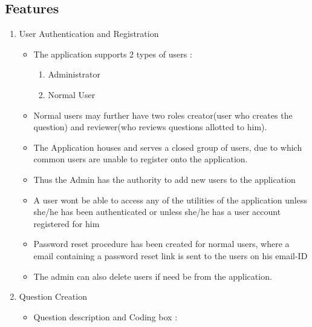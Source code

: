 \documentclass[a4paper,12pt,oneside]{book}
\begin{document}
\subsection{Features}
    \begin{enumerate}
      \item User Authentication and Registration
        \begin{itemize}
            \item The application supports 2 types of users :
                \begin{enumerate}
                    \item Administrator 
                    \item Normal User
                \end{enumerate}
                
            \item Normal users may further have two roles creator(user who creates the question) and reviewer(who reviews questions allotted to him).
            
            \item The Application houses and serves a closed group of users, due to which common users are unable to register onto the application. 
            
            \item Thus the Admin has the authority to add new users to the application 
            
            \item A user wont be able to access any of the utilities of the application unless she/he has been authenticated or unless she/he has a user account registered for him 
            
            \item Password reset procedure has been created for normal users, where a email containing a password reset link is sent to the users on his email-ID 
            
            \item The admin can also delete users if need be from the application.
        \end{itemize}
        
        \item Question Creation 
            \begin{itemize}
            
            \item Question description and Coding box : 
            

\end{itemize}
\end{enumerate}
\end{document}
